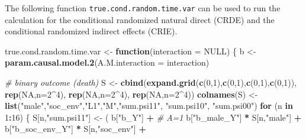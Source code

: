 \documentclass[
]{book}
\newenvironment{Shaded}{\begin{snugshade}}{\end{snugshade}}
\newcommand{\AttributeTok}[1]{\textcolor[rgb]{0.13,0.29,0.53}{#1}}
\newcommand{\CommentTok}[1]{\textcolor[rgb]{0.56,0.35,0.01}{\textit{#1}}}
\newcommand{\ConstantTok}[1]{\textcolor[rgb]{0.56,0.35,0.01}{#1}}
\newcommand{\ControlFlowTok}[1]{\textcolor[rgb]{0.13,0.29,0.53}{\textbf{#1}}}
\newcommand{\DecValTok}[1]{\textcolor[rgb]{0.00,0.00,0.81}{#1}}
\newcommand{\FunctionTok}[1]{\textcolor[rgb]{0.13,0.29,0.53}{\textbf{#1}}}
\newcommand{\NormalTok}[1]{#1}
\newcommand{\OtherTok}[1]{\textcolor[rgb]{0.56,0.35,0.01}{#1}}
\newcommand{\SpecialCharTok}[1]{\textcolor[rgb]{0.81,0.36,0.00}{\textbf{#1}}}
\newcommand{\StringTok}[1]{\textcolor[rgb]{0.31,0.60,0.02}{#1}}
\begin{document}
The following function \texttt{true.cond.random.time.var} can be used to run the calculation for the conditional randomized natural direct (CRDE) and the conditional randomized indirect effects (CRIE).

\begin{Shaded}
\begin{Highlighting}[]
\NormalTok{true.cond.random.time.var }\OtherTok{\textless{}{-}} \ControlFlowTok{function}\NormalTok{(}\AttributeTok{interaction =} \ConstantTok{NULL}\NormalTok{) \{}
\NormalTok{  b }\OtherTok{\textless{}{-}} \FunctionTok{param.causal.model.2}\NormalTok{(}\AttributeTok{A.M.interaction =}\NormalTok{ interaction)}
  
  \CommentTok{\# binary outcome (death)}
\NormalTok{  S }\OtherTok{\textless{}{-}} \FunctionTok{cbind}\NormalTok{(}\FunctionTok{expand.grid}\NormalTok{(}\FunctionTok{c}\NormalTok{(}\DecValTok{0}\NormalTok{,}\DecValTok{1}\NormalTok{),}\FunctionTok{c}\NormalTok{(}\DecValTok{0}\NormalTok{,}\DecValTok{1}\NormalTok{),}\FunctionTok{c}\NormalTok{(}\DecValTok{0}\NormalTok{,}\DecValTok{1}\NormalTok{),}\FunctionTok{c}\NormalTok{(}\DecValTok{0}\NormalTok{,}\DecValTok{1}\NormalTok{)), }\FunctionTok{rep}\NormalTok{(}\ConstantTok{NA}\NormalTok{,}\AttributeTok{n=}\DecValTok{2}\SpecialCharTok{\^{}}\DecValTok{4}\NormalTok{), }
             \FunctionTok{rep}\NormalTok{(}\ConstantTok{NA}\NormalTok{,}\AttributeTok{n=}\DecValTok{2}\SpecialCharTok{\^{}}\DecValTok{4}\NormalTok{), }\FunctionTok{rep}\NormalTok{(}\ConstantTok{NA}\NormalTok{,}\AttributeTok{n=}\DecValTok{2}\SpecialCharTok{\^{}}\DecValTok{4}\NormalTok{))}
  \FunctionTok{colnames}\NormalTok{(S) }\OtherTok{\textless{}{-}} \FunctionTok{list}\NormalTok{(}\StringTok{"male"}\NormalTok{,}\StringTok{"soc\_env"}\NormalTok{,}\StringTok{"L1"}\NormalTok{,}\StringTok{"M"}\NormalTok{,}\StringTok{"sum.psi11"}\NormalTok{, }\StringTok{"sum.psi10"}\NormalTok{, }
                      \StringTok{"sum.psi00"}\NormalTok{)}
  \ControlFlowTok{for}\NormalTok{ (n }\ControlFlowTok{in} \DecValTok{1}\SpecialCharTok{:}\DecValTok{16}\NormalTok{) \{}
\NormalTok{    S[n,}\StringTok{"sum.psi11"}\NormalTok{] }\OtherTok{\textless{}{-}}\NormalTok{  ( b[}\StringTok{"b\_Y"}\NormalTok{] }\SpecialCharTok{+}                                           \CommentTok{\# A=1}
\NormalTok{                             b[}\StringTok{"b\_male\_Y"}\NormalTok{] }\SpecialCharTok{*}\NormalTok{ S[n,}\StringTok{"male"}\NormalTok{] }\SpecialCharTok{+} 
\NormalTok{                             b[}\StringTok{"b\_soc\_env\_Y"}\NormalTok{] }\SpecialCharTok{*}\NormalTok{ S[n,}\StringTok{"soc\_env"}\NormalTok{] }\SpecialCharTok{+} 

\end{Highlighting}
\end{Shaded}
\end{document}
